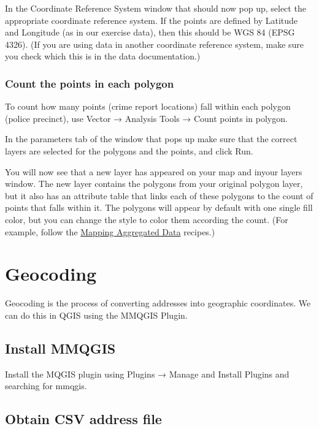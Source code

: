 \documentclass[]{book}
\begin{document}
In the Coordinate Reference System window that should now pop up, select the appropriate coordinate reference system. If the points are defined by Latitude and Longitude (as in our exercise data), then this should be WGS 84 (EPSG 4326). (If you are using data in another coordinate reference system, make sure you check which this is in the data documentation.)

\hypertarget{count-the-points-in-each-polygon}{%
\subsection{Count the points in each polygon}\label{count-the-points-in-each-polygon}}

To count how many points (crime report locations) fall within each polygon (police precinct), use Vector → Analysis Tools → Count points in polygon.

In the parameters tab of the window that pops up make sure that the correct layers are selected for the polygons and the points, and click Run.

You will now see that a new layer has appeared on your map and inyour layers window. The new layer contains the polygons from your original polygon layer, but it also has an attribute table that links each of these polygons to the count of points that falls within it. The polygons will appear by default with one single fill color, but you can change the style to color them according the count. (For example, follow the \protect\hyperlink{mapping-aggregated-data}{Mapping Aggregated Data} recipes.)

\hypertarget{geocoding}{%
\chapter{Geocoding}\label{geocoding}}

Geocoding is the process of converting addresses into geographic coordinates. We can do this in QGIS using the MMQGIS Plugin.

\hypertarget{install-mmqgis}{%
\section{Install MMQGIS}\label{install-mmqgis}}

Install the MQGIS plugin using Plugins → Manage and Install Plugins and searching for mmqgis.

\hypertarget{obtain-csv-address-file}{%
\section{Obtain CSV address file}\label{obtain-csv-address-file}}
\end{document}
